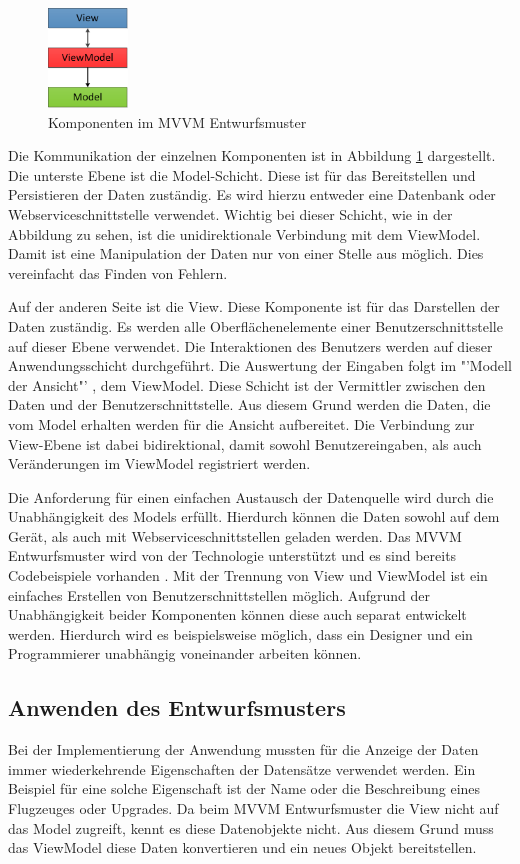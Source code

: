 \begin{figure}
\centering
\includegraphics[height=100px]{images/mvvm}
\caption{Komponenten im MVVM Entwurfsmuster}
\label{mvvm}
\end{figure}
Die Kommunikation der einzelnen Komponenten ist in Abbildung \ref{mvvm} dargestellt. Die unterste Ebene ist die Model-Schicht. Diese ist für das Bereitstellen und Persistieren der Daten zuständig. Es wird hierzu entweder eine Datenbank oder Webserviceschnittstelle verwendet. Wichtig bei dieser Schicht, wie in der Abbildung zu sehen, ist die unidirektionale Verbindung mit dem ViewModel. Damit ist eine Manipulation der Daten nur von einer Stelle aus möglich. Dies vereinfacht das Finden von Fehlern. \par
Auf der anderen Seite ist die View. Diese Komponente ist für das Darstellen der Daten zuständig. Es werden alle Oberflächenelemente einer Benutzerschnittstelle auf dieser Ebene verwendet. Die Interaktionen des Benutzers werden auf dieser Anwendungsschicht durchgeführt. Die Auswertung der Eingaben folgt im "'Modell der Ansicht"' \cite[S.9]{bib:mvvm}, dem ViewModel. Diese Schicht ist der Vermittler zwischen den Daten und der Benutzerschnittstelle. Aus diesem Grund werden die Daten, die vom Model erhalten werden für die Ansicht aufbereitet. Die Verbindung zur View-Ebene ist dabei bidirektional, damit sowohl Benutzereingaben, als auch Veränderungen im ViewModel registriert werden.
\par 
Die Anforderung für einen einfachen Austausch der Datenquelle wird durch die Unabhängigkeit des Models erfüllt. Hierdurch können die Daten sowohl auf dem Gerät, als auch mit Webserviceschnittstellen geladen werden. Das MVVM Entwurfsmuster wird von der Technologie unterstützt und es sind bereits Codebeispiele vorhanden \cite{bib:winMvvm}. Mit der Trennung von View und ViewModel ist ein einfaches Erstellen von Benutzerschnittstellen möglich. Aufgrund der Unabhängigkeit beider Komponenten können diese auch separat entwickelt werden. Hierdurch wird es beispielsweise möglich, dass ein Designer und ein Programmierer unabhängig voneinander arbeiten können. 

\subsection{Anwenden des Entwurfsmusters}
Bei der Implementierung der Anwendung mussten für die Anzeige der Daten immer wiederkehrende Eigenschaften der Datensätze verwendet werden. Ein Beispiel für eine solche Eigenschaft ist der Name oder die Beschreibung eines Flugzeuges oder Upgrades. Da beim MVVM Entwurfsmuster die View nicht auf das Model zugreift, kennt es diese Datenobjekte nicht. Aus diesem Grund muss das ViewModel diese Daten konvertieren und ein neues Objekt bereitstellen. 


